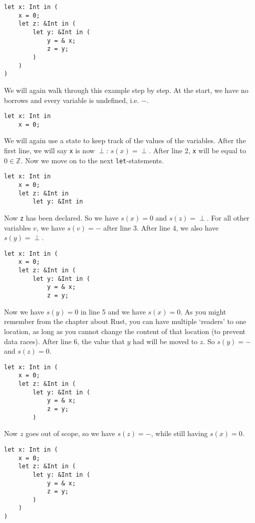 \begin{verbatim}
let x: Int in (
    x = 0;
    let z: &Int in (
        let y: &Int in (
            y = & x;
            z = y;
        )
    ) 
)
\end{verbatim} 

We will again walk through this example step by step. At the start, we have no borrows and every variable is undefined, i.e. $-$.

\begin{verbatim}
let x: Int in 
    x = 0;
\end{verbatim}

We will again use a state to keep track of the values of the variables. After the first line, we will say \texttt{x} is now $\perp$: $s(x) = \perp$.  
After line 2, \verb|x| will be equal to $0 \in \mathbb{Z}$. Now we move on to the next \verb|let|-statements.

\begin{verbatim}
let x: Int in 
    x = 0;
    let z: &Int in 
        let y: &Int in
\end{verbatim}

Now \verb|z| has been declared. So we have $s(x) = 0$ and $s(z) = \perp$. For all other variables $v$, we have $s(v) = -$ after line 3. After line 4, we also have $s(y) = \perp$.

\begin{verbatim}
let x: Int in (
    x = 0;
    let z: &Int in (
        let y: &Int in (
            y = & x;
            z = y;
\end{verbatim}

Now we have $s(y) = 0$ in line 5 and we have $s(x) = 0$. As you might remember from the chapter about Rust, you can have multiple `readers' to one location, as long as you cannot change the content of that location (to prevent data races). After line 6, the value that $y$ had will be moved to $z$. So $s(y) = -$ and $s(z) = 0$.

\begin{verbatim}
let x: Int in (
    x = 0;
    let z: &Int in (
        let y: &Int in (
            y = & x;
            z = y;
        )
\end{verbatim}

Now $z$ goes out of scope, so we have $s(z) = -$, while still having $s(x) = 0$. 

\begin{verbatim}
let x: Int in (
    x = 0;
    let z: &Int in (
        let y: &Int in (
            y = & x;
            z = y;
        )
    ) 
)
\end{verbatim} 

